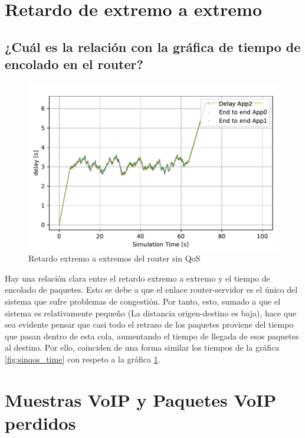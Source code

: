 \section{Retardo de extremo a extremo}

\subsection{¿Cuál es la relación con la gráfica de tiempo de encolado en el router?}

\begin{figure}[!ht]
    \centering
    \includegraphics{graficas/sinQoS/delay_SinQoS.pdf}
    \caption{Retardo extremo a extremos del router sin QoS}
    \label{fig:sinqos_endtoend}
\end{figure}

Hay una relación clara entre el retardo extremo a extremo y el tiempo de encolado de paquetes. Esto se debe a 
que el enlace router-servidor es el único del sistema que sufre problemas de congestión. Por tanto, esto, sumado
a que el sistema es relativamente pequeño (La distancia origen-destino es baja), hace que sea 
evidente pensar que casi todo el retraso de los paquetes proviene del tiempo que pasan dentro 
de esta cola, aumentando el tiempo de llegada de esos paquetes al destino. Por ello, coinciden de 
una forma similar los tiempos de la gráfica \ref{fig:sinqos_time} con respeto a la gráfica \ref{fig:sinqos_endtoend}.


\section{Muestras VoIP y Paquetes VoIP perdidos}

